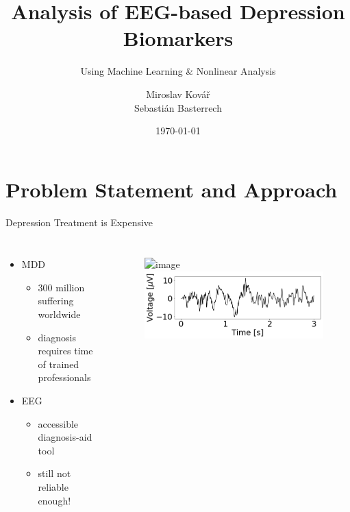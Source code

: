 \documentclass{beamer}
\title{Analysis of EEG-based Depression Biomarkers}
\subtitle{Using Machine Learning \& Nonlinear Analysis}
\author{Miroslav Kovář\\[1mm]\small{Sebastián Basterrech}}
\institute{FNSPE, CTU}
\date{\today}
\begin{document}

\begin{frame}
	\maketitle %
\end{frame}


\section{Problem Statement and Approach} 
\begin{frame}{Depression Treatment is Expensive}
	\begin{columns}
        \begin{itemize}
          \item MDD
            \begin{itemize}
              \item<2-> 300 million suffering worldwide %
              \item<3-> diagnosis requires time of trained professionals %
            \end{itemize}
          \item EEG 
            \begin{itemize}
              \item<4-> accessible diagnosis-aid tool %
              \item<5-> still not reliable enough! 
            \end{itemize}
        \end{itemize}
        \vfill
            \begin{figure}
                \includegraphics<1->[width=0.9\linewidth]{./Images/electrodes.png}
                \\
                \includegraphics[width=\linewidth]{./Images/signal.png}
            \end{figure}
	\end{columns}
\end{frame}
\end{document}
